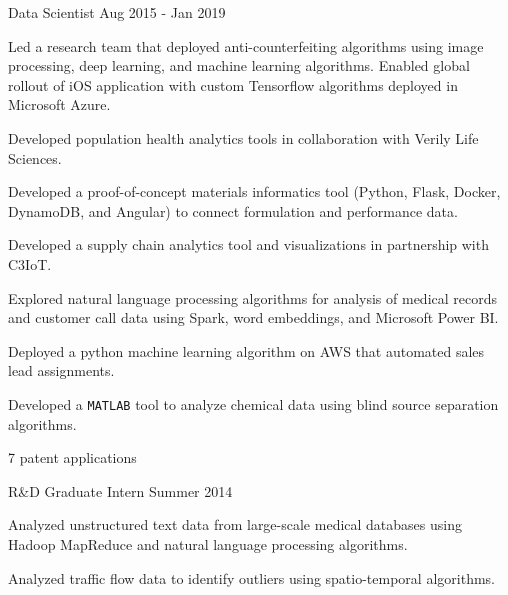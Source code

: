 \begin{cventries}
  \cventry
    {Data Scientist} %
    {} %
    {} %
    {Aug 2015 - Jan 2019} %
    {
      \begin{cvitems} %
      \item {Led a research team that deployed anti-counterfeiting algorithms using image
          processing, deep learning, and machine learning algorithms. Enabled global
          rollout of iOS application with custom Tensorflow algorithms deployed in
          Microsoft Azure.}
        \item {Developed population health analytics tools in collaboration with Verily 
            Life Sciences.}
        \item {Developed a proof-of-concept materials informatics tool (Python, Flask,
            Docker, DynamoDB, and Angular) to connect formulation and performance data.}
        \item {Developed a supply chain analytics tool and visualizations in partnership
            with C3IoT.}
        \item {Explored natural language processing algorithms for analysis of medical
            records and customer call data using Spark, word embeddings, and
            Microsoft Power BI.}
        \item {Deployed a python machine learning algorithm on AWS that automated sales
            lead assignments.}
        \item {Developed a {\texttt{MATLAB}} tool to analyze chemical data using blind source
            separation algorithms.}
        \item {7 patent applications}
      \end{cvitems}
    }

  \cventry
    {R\&D Graduate Intern} %
    {} %
    {} %
    {Summer 2014} %
    {
      \begin{cvitems} %
      \item {Analyzed unstructured text data from large-scale medical
        databases using Hadoop MapReduce and natural language processing
        algorithms.}
      \item {Analyzed traffic flow data to identify outliers using spatio-temporal
        algorithms.}
      \end{cvitems}
    }


\end{cventries}
